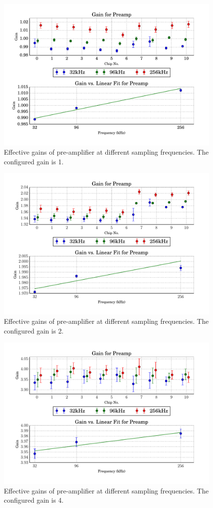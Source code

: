 \begin{figure}
    \centering
    \includegraphics[width=.85\linewidth]{images/plots/dc_slope_preamp_gain+1.pdf}
    \caption{Effective gains of pre-amplifier at different sampling frequencies. The configured gain is 1.}
    \label{fig:preamp_slope+1}
\end{figure}
\begin{figure}
    \centering
    \includegraphics[width=.85\linewidth]{images/plots/dc_slope_preamp_gain+2.pdf}
    \caption{Effective gains of pre-amplifier at different sampling frequencies. The configured gain is 2.}
    \label{fig:preamp_slope+2}
\end{figure}
\begin{figure}
    \centering
    \includegraphics[width=.85\linewidth]{images/plots/dc_slope_preamp_gain+4.pdf}
    \caption{Effective gains of pre-amplifier at different sampling frequencies. The configured gain is 4.}
    \label{fig:preamp_slope+4}
\end{figure}
